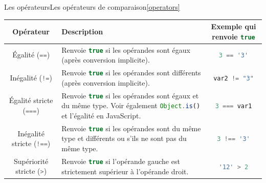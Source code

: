 \documentclass{beamer}
\begin{document}
    \begin{frame}[fragile]{Les opérateurs}{Les opérateurs de comparaison\cref{operators}}
        \begin{tiny}
            \begin{table}[h!]
                \centering
                \begin{tabular}{|c|p{4cm}|c|}
                    \hline
                    \textbf{Opérateur}                                       & \textbf{Description}                                                                                                                                                               & \textbf{Exemple qui renvoie \lstinline[language=Javascript]!true!} \\
                    \hline
                    Égalité (\lstinline[language=Javascript]!==!)            & Renvoie \lstinline[language=Javascript]!true! si les opérandes sont égaux (après conversion implicite).                                                                            & \lstinline[language=Javascript]!3 == '3'!                          \\
                    \hline
                    Inégalité (\lstinline[language=Javascript]|!=|)          & Renvoie \lstinline[language=Javascript]!true! si les opérandes sont différents (après conversion implicite).                                                                       & \lstinline[language=Javascript]|var2 != "3"|                       \\
                    \hline
                    Égalité stricte (\lstinline[language=Javascript]!===!)   & Renvoie \lstinline[language=Javascript]!true! si les opérandes sont égaux et du même type. Voir également \lstinline[language=Javascript]!Object.is()! et l'égalité en JavaScript. & \lstinline[language=Javascript]!3 === var1!                        \\
                    \hline
                    Inégalité stricte (\lstinline[language=Javascript]|!==|) & Renvoie \lstinline[language=Javascript]!true! si les opérandes sont du même type et différents ou s'ils ne sont pas du même type.                                                  & \lstinline[language=Javascript]|3 !== '3'|                         \\
                    \hline
                    Supériorité stricte (\lstinline[language=Javascript]!>!) & Renvoie \lstinline[language=Javascript]!true! si l'opérande gauche est strictement supérieur à l'opérande droit.                                                                   & \lstinline[language=Javascript]!'12' > 2!                          \\

\end{tabular}
\end{table}
\end{tiny}
\end{frame}
\end{document}
